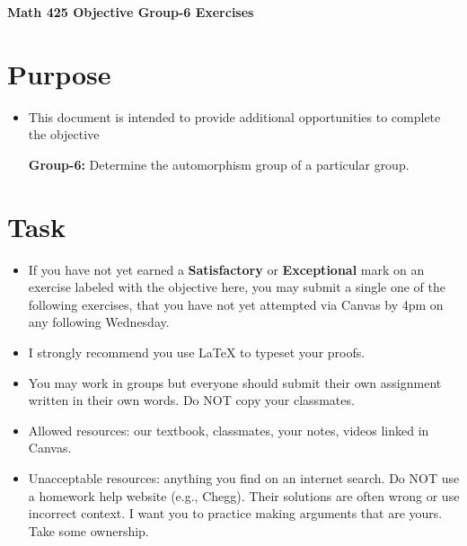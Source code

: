\documentclass[12pt]{article}
\begin{document}
	\begin{center}
		{\Large \bf Math 425 Objective Group-6 Exercises}
	\end{center}
	\section*{Purpose}
	\begin{itemize}
		\item This document is intended to provide additional opportunities to complete the objective
		
		\textbf{Group-6:}  Determine the automorphism group of a particular group.
	\end{itemize}
	\section*{Task}
	\begin{itemize}
		\item If you have not yet earned a \textbf{Satisfactory} or \textbf{Exceptional} mark on an exercise labeled with the objective here, you may submit a single one of the following exercises, that you have not yet attempted via Canvas by 4pm on any following Wednesday.
		\item I strongly recommend you use LaTeX to typeset your proofs.
		\item You may work in groups but everyone should submit their own assignment written in their own words.  Do NOT copy your classmates.
		\item Allowed resources: our textbook, classmates, your notes, videos linked in Canvas.
		\item Unacceptable resources: anything you find on an internet search. Do NOT use a homework help website (e.g., Chegg). Their solutions are often wrong or use incorrect context.  I want you to practice making arguments that are yours. Take some ownership.
	\end{itemize}
\end{document}
